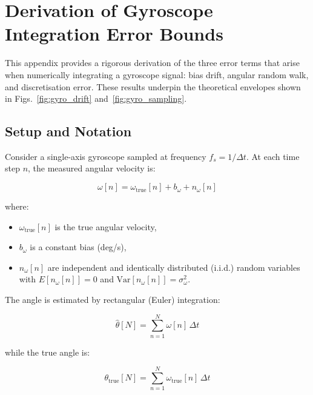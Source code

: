 \appendix

\section{Derivation of Gyroscope Integration Error Bounds}
\label{app:error_bounds}

This appendix provides a rigorous derivation of the three error terms that
arise when numerically integrating a gyroscope signal: bias drift, angular
random walk, and discretisation error. These results underpin the theoretical
envelopes shown in Figs.~\ref{fig:gyro_drift} and~\ref{fig:gyro_sampling}.

\subsection{Setup and Notation}
\label{app:setup}

Consider a single-axis gyroscope sampled at frequency $f_s = 1/\Delta t$.
At each time step $n$, the measured angular velocity is:

\begin{equation}
  \omega[n] = \omega_\text{true}[n] + b_\omega + n_\omega[n]
  \label{eq:app:gyro_model}
\end{equation}

\noindent where:
\begin{itemize}
  \item $\omega_\text{true}[n]$ is the true angular velocity,
  \item $b_\omega$ is a constant bias (deg/s),
  \item $n_\omega[n]$ are independent and identically distributed (i.i.d.)
        random variables with $E[n_\omega[n]] = 0$ and
        $\text{Var}[n_\omega[n]] = \sigma_\omega^2$.
\end{itemize}

The angle is estimated by rectangular (Euler) integration:

\begin{equation}
  \hat{\theta}[N] = \sum_{n=1}^{N} \omega[n]\,\Delta t
  \label{eq:app:integration}
\end{equation}

\noindent while the true angle is:

\begin{equation}
  \theta_\text{true}[N] = \sum_{n=1}^{N} \omega_\text{true}[n]\,\Delta t
  \label{eq:app:true_angle}
\end{equation}

